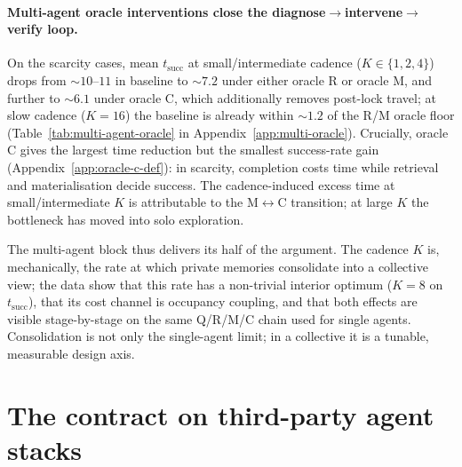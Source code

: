 \documentclass{article}
\begin{document}
\paragraph{Multi-agent oracle interventions close the diagnose$\to$intervene$\to$verify loop.}
On the scarcity cases, mean $t_{\mathrm{succ}}$ at small/intermediate cadence ($K{\in}\{1,2,4\}$) drops from $\sim10$--$11$ in baseline to $\sim7.2$ under either oracle R or oracle M, and further to $\sim6.1$ under oracle C, which additionally removes post-lock travel; at slow cadence ($K{=}16$) the baseline is already within $\sim1.2$ of the R/M oracle floor (Table~\ref{tab:multi-agent-oracle} in Appendix~\ref{app:multi-oracle}). Crucially, oracle C gives the largest time reduction but the smallest success-rate gain (Appendix~\ref{app:oracle-c-def}): in scarcity, completion costs time while retrieval and materialisation decide success. The cadence-induced excess time at small/intermediate $K$ is attributable to the M$\leftrightarrow$C transition; at large $K$ the bottleneck has moved into solo exploration.

The multi-agent block thus delivers its half of the argument. The
cadence $K$ is, mechanically, the rate at which private memories
consolidate into a collective view; the data show that this rate has a
non-trivial interior optimum ($K\!=\!8$ on $t_{\mathrm{succ}}$), that
its cost channel is occupancy coupling, and that both effects are
visible stage-by-stage on the same Q/R/M/C chain used for single
agents. Consolidation is not only the single-agent limit; in a
collective it is a tunable, measurable design axis.

\section{The contract on third-party agent stacks}
\label{sec:external}
\end{document}
